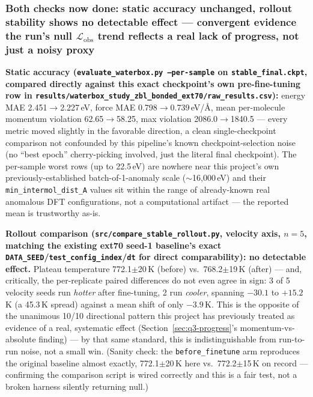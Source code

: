 \documentclass[11pt]{article}
\begin{document}
\subsubsection{Both checks now done: static accuracy unchanged, rollout stability shows no detectable effect --- convergent evidence the run's null $\mathcal{L}_{\text{obs}}$ trend reflects a real lack of progress, not just a noisy proxy}
\label{sec:q4-stable-8x100-eval}

\textbf{Static accuracy (\texttt{evaluate\_waterbox.py --per-sample} on
\texttt{stable\_final.ckpt}, compared directly against this exact
checkpoint's own pre-fine-tuning row in
\texttt{results/waterbox\_study\_zbl\_bonded\_ext70/raw\_results.csv}):}
energy MAE 2.451$\to$2.227\,eV, force MAE 0.798$\to$0.739\,eV/\AA, mean
per-molecule momentum violation 62.65$\to$58.25, max violation
2086.0$\to$1840.5 --- every metric moved slightly in the favorable
direction, a clean single-checkpoint comparison not confounded by this
pipeline's known checkpoint-selection noise (no ``best epoch'' cherry-picking
involved, just the literal final checkpoint). The per-sample worst rows
(up to 22.5\,eV) are nowhere near this project's own previously-established
batch-of-1-anomaly scale ($\sim$16{,}000\,eV) and their
\texttt{min\_intermol\_dist\_A} values sit within the range of already-known
real anomalous DFT configurations, not a computational artifact --- the
reported mean is trustworthy as-is.

\textbf{Rollout comparison (\texttt{src/compare\_stable\_rollout.py}, velocity
axis, $n=5$, matching the existing ext70 seed-1 baseline's exact
\texttt{DATA\_SEED}/\texttt{test\_config\_index}/\texttt{dt} for direct
comparability): no detectable effect.} Plateau temperature 772.1$\pm$20\,K
(before) vs.\ 768.2$\pm$19\,K (after) --- and, critically, the per-replicate
paired differences do not even agree in sign: 3 of 5 velocity seeds run
\emph{hotter} after fine-tuning, 2 run \emph{cooler}, spanning $-30.1$ to
$+15.2$\,K (a 45.3\,K spread) against a mean shift of only $-3.9$\,K. This is
the opposite of the unanimous 10/10 directional pattern this project has
previously treated as evidence of a real, systematic effect
(Section~\ref{sec:q3-progress}'s momentum-vs-absolute finding) --- by that
same standard, this is indistinguishable from run-to-run noise, not a small
win. (Sanity check: the \texttt{before\_finetune} arm reproduces the
original baseline almost exactly, 772.1$\pm$20\,K here vs.\ 772.2$\pm$15\,K
on record --- confirming the comparison script is wired correctly and this
is a fair test, not a broken harness silently returning null.)
\end{document}
